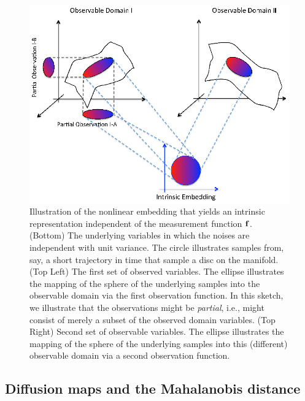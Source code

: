\begin{figure}[ht]
\includegraphics[width=5in]{fig1}
\caption[Illustration of the underlying theory in nonlinear intrinsic variables]{Illustration of the nonlinear embedding that yields an intrinsic representation independent of the measurement function $\mathbf{f}$. (Bottom) The underlying variables in which the noises are independent with unit variance. The circle illustrates samples from, say, a short trajectory in time that sample a disc on the manifold. (Top Left) The first set of observed variables. The ellipse illustrates the mapping of the sphere of the underlying samples into the observable domain via the first observation function. In this sketch, we illustrate that the observations might be {\em partial}, i.e., might consist of merely a subset of the observed domain variables. (Top Right) Second set of observable variables. The ellipse illustrates the mapping of the sphere of the underlying samples into this (different) observable domain via a second observation function.
\label{fig:IntrinsicIllustration}}
\end{figure}

\subsection{Diffusion maps and the Mahalanobis distance}
\label{subsec:mahalanobis}

